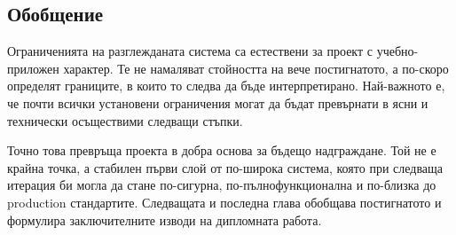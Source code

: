 \subsection{Обобщение}

Ограниченията на разглежданата система са естествени за проект с учебно-приложен характер. Те не намаляват стойността на вече постигнатото, а по-скоро определят границите, в които то следва да бъде интерпретирано. Най-важното е, че почти всички установени ограничения могат да бъдат превърнати в ясни и технически осъществими следващи стъпки.

Точно това превръща проекта в добра основа за бъдещо надграждане. Той не е крайна точка, а стабилен първи слой от по-широка система, която при следваща итерация би могла да стане по-сигурна, по-пълнофункционална и по-близка до production стандартите. Следващата и последна глава обобщава постигнатото и формулира заключителните изводи на дипломната работа.

